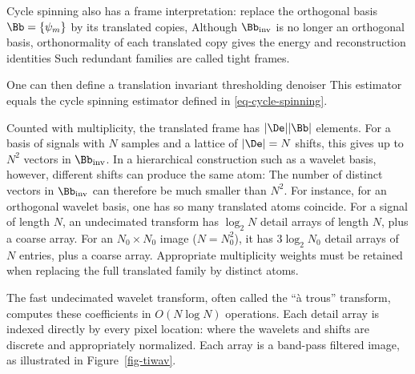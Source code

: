 Cycle spinning also has a frame interpretation: replace the orthogonal basis $\Bb = \{\psi_m\}$ by its translated copies,
Although $\Bb_{\text{inv}}$ is no longer an orthogonal basis, orthonormality of each translated copy gives the energy and reconstruction identities
Such redundant families are called tight frames.

One can then define a translation invariant thresholding denoiser
This estimator equals the cycle spinning estimator defined in \eqref{eq-cycle-spinning}.

Counted with multiplicity, the translated frame has $|\De| |\Bb|$ elements.
For a basis of signals with $N$ samples and a lattice of $|\De|=N$ shifts, this gives up to $N^2$ vectors in $\Bb_{\text{inv}}$. In a hierarchical construction such as a wavelet basis, however, different shifts can produce the same atom:
The number of distinct vectors in $\Bb_{\text{inv}}$ can therefore be much smaller than $N^2$.
For instance, for an orthogonal wavelet basis, one has
so many translated atoms coincide. For a signal of length $N$, an undecimated transform has $\log_2N$ detail arrays of length $N$, plus a coarse array. For an $N_0\times N_0$ image ($N=N_0^2$), it has $3\log_2N_0$ detail arrays of $N$ entries, plus a coarse array. Appropriate multiplicity weights must be retained when replacing the full translated family by distinct atoms.

The fast undecimated wavelet transform, often called the ``\`a trous'' transform, computes these coefficients in $O(N\log N)$ operations. Each detail array is indexed directly by every pixel location:
where the wavelets and shifts are discrete and appropriately normalized. Each array is a band-pass filtered image, as illustrated in Figure~\ref{fig-tiwav}.



